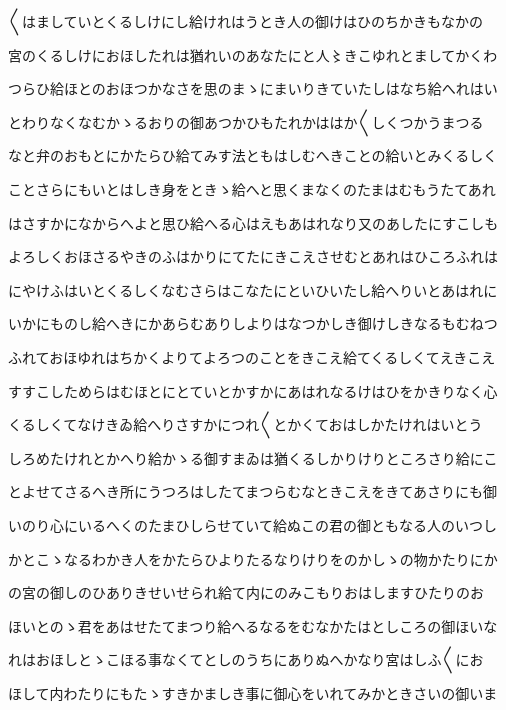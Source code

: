\documentclass[a4paper,11pt,landscape]{ltjtarticle}
\begin{document}
\par\medskip
〱はましていとくるしけにし給けれはうとき人の御けはひのちかきもなかの
\par\medskip
宮のくるしけにおほしたれは猶れいのあなたにと人〻きこゆれとましてかくわ
\par\medskip
つらひ給ほとのおほつかなさを思のまゝにまいりきていたしはなち給へれはい
\par\medskip
とわりなくなむかゝるおりの御あつかひもたれかははか〱しくつかうまつる
\par\medskip
なと弁のおもとにかたらひ給てみす法ともはしむへきことの給いとみくるしく
\par\medskip
ことさらにもいとはしき身をときゝ給へと思くまなくのたまはむもうたてあれ
\par\medskip
はさすかになからへよと思ひ給へる心はえもあはれなり又のあしたにすこしも
\par\medskip
よろしくおほさるやきのふはかりにてたにきこえさせむとあれはひころふれは
\par\medskip
にやけふはいとくるしくなむさらはこなたにといひいたし給へりいとあはれに
\par\medskip
いかにものし給へきにかあらむありしよりはなつかしき御けしきなるもむねつ
\par\medskip
ふれておほゆれはちかくよりてよろつのことをきこえ給てくるしくてえきこえ
\par\medskip
すすこしためらはむほとにとていとかすかにあはれなるけはひをかきりなく心
\par\medskip
くるしくてなけきゐ給へりさすかにつれ〱とかくておはしかたけれはいとう
\par\medskip
しろめたけれとかへり給かゝる御すまゐは猶くるしかりけりところさり給にこ
\par\medskip
とよせてさるへき所にうつろはしたてまつらむなときこえをきてあさりにも御
\par\medskip
いのり心にいるへくのたまひしらせていて給ぬこの君の御ともなる人のいつし
\par\medskip
かとこゝなるわかき人をかたらひよりたるなりけりをのかしゝの物かたりにか
\par\medskip
の宮の御しのひありきせいせられ給て内にのみこもりおはしますひたりのお
\par\medskip
ほいとのゝ君をあはせたてまつり給へるなるをむなかたはとしころの御ほいな
\par\medskip
れはおほしとゝこほる事なくてとしのうちにありぬへかなり宮はしふ〱にお
\par\medskip
ほして内わたりにもたゝすきかましき事に御心をいれてみかときさいの御いま
\par\medskip
\end{document}
